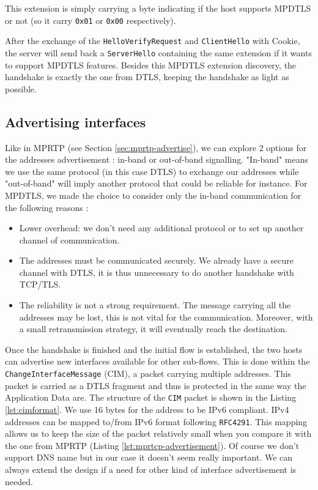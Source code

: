 This extension is simply carrying a byte indicating if the host supports MPDTLS or not (so it carry \texttt{0x01} or \texttt{0x00} respectively).

After the exchange of the \texttt{HelloVerifyRequest} and \texttt{ClientHello} with Cookie, the server will send back a \texttt{ServerHello} containing the same extension if it wants to support MPDTLS features. Besides this MPDTLS extension discovery, the handshake is exactly the one from DTLS, keeping the handshake as light as possible.

\subsection{Advertising interfaces}
\label{sec:advertise}

Like in MPRTP (see Section \ref{sec:mprtp-advertise}), we can explore 2 options for the addresses advertisement : in-band or out-of-band signalling. "In-band" means we use the same protocol (in this case DTLS) to exchange our addresses while "out-of-band" will imply another protocol that could be reliable for instance. For MPDTLS, we made the choice to consider only the in-band communication for the following reasons : 

\begin{itemize}
\item Lower overhead: we don't need any additional protocol or to set up another channel of communication.
\item The addresses must be communicated securely. We already have a secure channel with DTLS, it is thus unnecessary to do another handshake with TCP/TLS.
\item The reliability is not a strong requirement. The message carrying all the addresses may be lost, this is not vital for the communication. Moreover, with a small retransmission strategy, it will eventually reach the destination.
\end{itemize}


Once the handshake is finished and the initial flow is established, the two hosts can advertise new interfaces available for other sub-flows. This is done within the \texttt{ChangeInterfaceMessage} (CIM), a packet carrying multiple addresses. This packet is carried as a DTLS fragment and thus is protected in the same way the Application Data are. The structure of the \texttt{CIM} packet is shown in the Listing \ref{lst:cimformat}. We use 16 bytes for the address to be IPv6 compliant. IPv4 addresses can be mapped to/from IPv6 format following \texttt{RFC4291}\cite{rfc4291}. This mapping allows us to keep the size of the packet relatively small when you compare it with the one from MPRTP (Listing \ref{lst:mprtcp-advertisement}). Of course we don't support DNS name but in our case it doesn't seem really important. We can always extend the design if a need for other kind of interface advertisement is needed.

